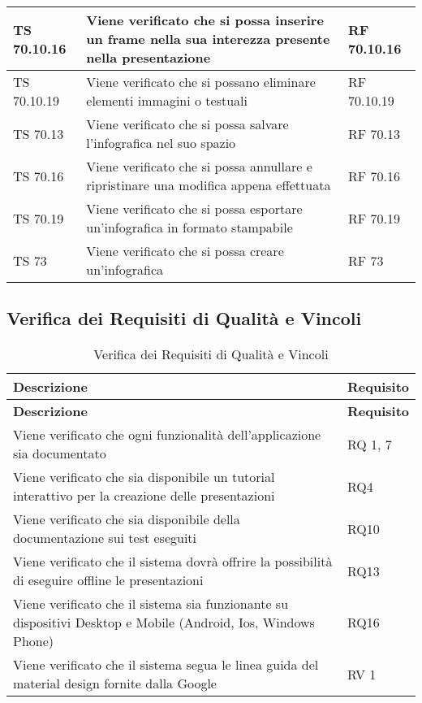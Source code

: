 {{\begin{longtable} [c]{| p{3cm} | p{6cm} |p{3cm}|}
			TS 70.10.16 & Viene verificato che si possa inserire un frame nella sua interezza presente nella presentazione & RF 70.10.16\\
			\hline
			TS 70.10.19 & Viene verificato che si possano eliminare elementi immagini o testuali & RF 70.10.19\\
			\hline
			TS 70.13 & Viene verificato che si possa salvare l'infografica nel suo spazio & RF 70.13\\
			\hline
			TS 70.16 & Viene verificato che si possa annullare e ripristinare una modifica appena effettuata & RF 70.16\\
			\hline
			TS 70.19 & Viene verificato che si possa esportare un'infografica in formato stampabile & RF 70.19\\
			\hline
			TS 73 & Viene verificato che si possa creare un'infografica & RF 73\\
			\hline
\end{longtable}
}
\newpage
\subsection{Verifica dei Requisiti di Qualità e Vincoli}{
		\renewcommand*{\arraystretch}{1.4}
		\begin{longtable} [c]{| p{7cm} |p{4cm}|}
			\caption{Verifica dei Requisiti di Qualità e Vincoli \label{tab:verReqQualVinc}}\\
			 \hline
			 \textbf{Descrizione} & \textbf{Requisito} \\
			 \hline
			 \endfirsthead
			 \hline
			 \textbf{Descrizione} & \textbf{Requisito} \\
			 \hline
			\endhead
			 \hline
			 \endfoot
			 \hline
			 \endlastfoot
			Viene verificato che ogni funzionalità dell'applicazione sia documentato & RQ 1, 7\\
			\hline
			Viene verificato che sia disponibile un tutorial interattivo per la creazione delle presentazioni & RQ4\\
			\hline
			Viene verificato che sia disponibile della documentazione sui test eseguiti & RQ10\\
			\hline
			Viene verificato che il sistema dovrà offrire la possibilità di eseguire offline le presentazioni & RQ13\\
			\hline
			Viene verificato che il sistema sia funzionante su dispositivi Desktop e Mobile (Android, Ios, Windows Phone) & RQ16\\
			\hline
			Viene verificato che il sistema segua le linea guida del material design fornite dalla Google & RV 1\\
\end{longtable}
}
}
